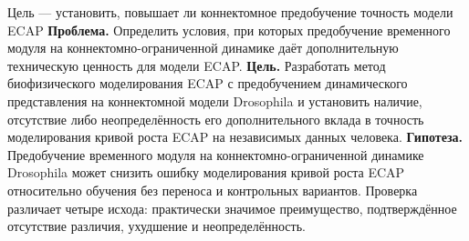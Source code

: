 \begin{frame}{Цель --- установить, повышает ли коннектомное предобучение точность модели ECAP}
\textbf{Проблема.} Определить условия, при которых предобучение временного модуля на коннектомно-ограниченной динамике даёт дополнительную техническую ценность для модели ECAP.
\SlideGap
\textbf{Цель.} Разработать метод биофизического моделирования ECAP с предобучением динамического представления на коннектомной модели Drosophila и установить наличие, отсутствие либо неопределённость его дополнительного вклада в точность моделирования кривой роста ECAP на независимых данных человека.
\SlideGap
\textbf{Гипотеза.} Предобучение временного модуля на коннектомно-ограниченной динамике Drosophila может снизить ошибку моделирования кривой роста ECAP относительно обучения без переноса и контрольных вариантов.
\SlideGap
Проверка различает четыре исхода: практически значимое преимущество, подтверждённое отсутствие различия, ухудшение и неопределённость.
\end{frame}
